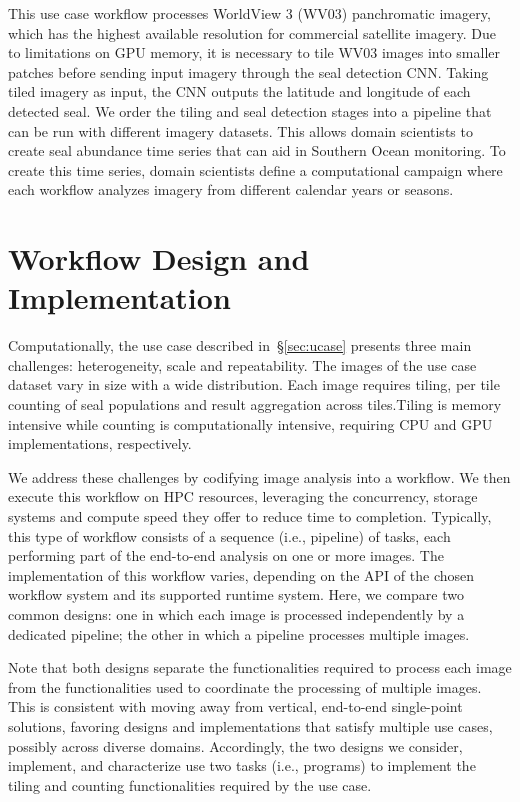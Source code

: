 This use case workflow processes WorldView 3 (WV03) panchromatic imagery, 
which has the highest available resolution for commercial satellite imagery.
Due to limitations on GPU memory, it is necessary to tile WV03 images into 
smaller patches before sending input imagery through the seal detection CNN.
Taking tiled imagery as input, the CNN outputs the latitude and longitude of 
each detected seal. We order the tiling and seal detection stages into a 
pipeline that can be run with different imagery datasets. This allows domain 
scientists to create seal abundance time series that can aid in Southern Ocean 
monitoring. To create this time series, domain scientists define a 
computational campaign where each workflow analyzes imagery from different 
calendar years or seasons.


\section{Workflow Design and Implementation}\label{sec:design}
Computationally, the use case described in~\S\ref{sec:ucase} presents three 
main challenges: heterogeneity, scale and repeatability. The images of the use 
case dataset vary in size with a wide distribution. Each image requires 
tiling, per tile counting of seal populations and result aggregation across 
tiles.Tiling is memory intensive while counting is computationally intensive, 
requiring CPU and GPU implementations, respectively.

We address these challenges by codifying image analysis into a workflow. We 
then execute this workflow on HPC resources, leveraging the concurrency, 
storage systems and compute speed they offer to reduce time to completion.
Typically, this type of workflow consists of a sequence (i.e., pipeline) of 
tasks, each performing part of the end-to-end analysis on one or more images.
The implementation of this workflow varies, depending on the API of the chosen 
workflow system and its supported runtime system. Here, we compare two common 
designs: one in which each image is processed independently by a dedicated 
pipeline; the other in which a pipeline processes multiple images.

Note that both designs separate the functionalities required to process each 
image from the functionalities used to coordinate the processing of multiple 
images. This is consistent with moving away from vertical, end-to-end 
single-point solutions, favoring designs and implementations that satisfy 
multiple use cases, possibly across diverse domains. Accordingly, the two 
designs we consider, implement, and characterize use two tasks (i.e., 
programs) to implement the tiling and counting functionalities required by the 
use case.


